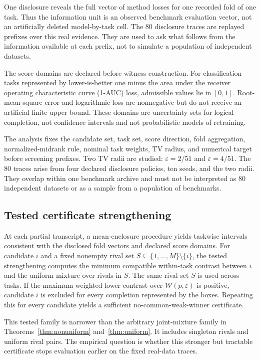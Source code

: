 \documentclass[preprint,11pt]{elsarticle}
\begin{document}
One disclosure reveals the full vector of method losses for one recorded fold of one task. Thus the information unit is an observed benchmark evaluation vector, not an artificially deleted model-by-task cell. The 80 disclosure traces are replayed prefixes over this real evidence. They are used to ask what follows from the information available at each prefix, not to simulate a population of independent datasets.

The score domains are declared before witness construction. For classification tasks represented by lower-is-better one minus the area under the receiver operating characteristic curve (1-AUC) loss, admissible values lie in $[0,1]$. Root-mean-square error and logarithmic loss are nonnegative but do not receive an artificial finite upper bound. These domains are uncertainty sets for logical completion, not confidence intervals and not probabilistic models of retraining.

The analysis fixes the candidate set, task set, score direction, fold aggregation, normalized-midrank rule, nominal task weights, TV radius, and numerical target before screening prefixes. Two TV radii are studied: $\varepsilon=2/51$ and $\varepsilon=4/51$. The 80 traces arise from four declared disclosure policies, ten seeds, and the two radii. They overlap within one benchmark archive and must not be interpreted as 80 independent datasets or as a sample from a population of benchmarks.

\subsection{Tested certificate strengthening}

At each partial transcript, a mean-enclosure procedure yields taskwise intervals consistent with the disclosed fold vectors and declared score domains. For candidate $i$ and a fixed nonempty rival set $S\subseteq\{1,\ldots,M\}\setminus\{i\}$, the tested strengthening computes the minimum compatible within-task contrast between $i$ and the uniform mixture over rivals in $S$. The same rival set $S$ is used across tasks. If the maximum weighted lower contrast over $\mathcal W(p,\varepsilon)$ is positive, candidate $i$ is excluded for every completion represented by the boxes. Repeating this for every candidate yields a sufficient no-common-weak-winner certificate.

This tested family is narrower than the arbitrary joint-mixture family in Theorems~\ref{thm:nonuniform} and~\ref{thm:uniform}. It includes singleton rivals and uniform rival pairs. The empirical question is whether this stronger but tractable certificate stops evaluation earlier on the fixed real-data traces.
\end{document}
